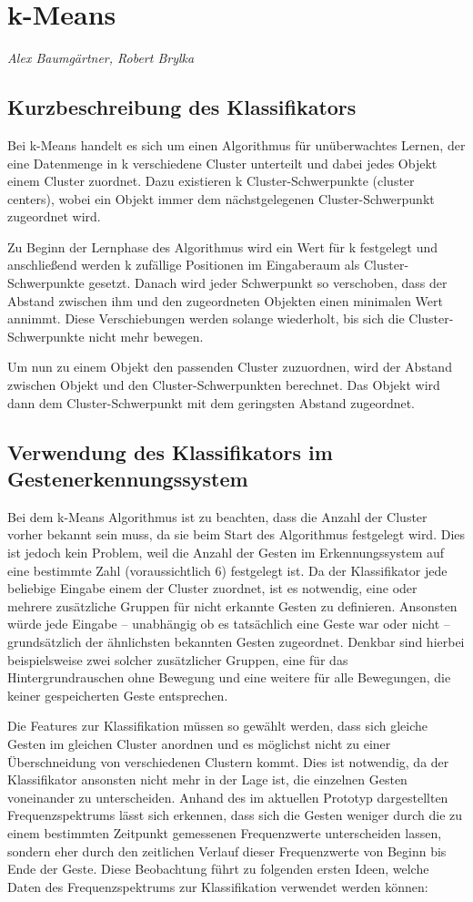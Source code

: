 \section{k-Means}
\textit{Alex Baumgärtner, Robert Brylka}
\subsection{Kurzbeschreibung des Klassifikators}
Bei k-Means handelt es sich um einen Algorithmus für unüberwachtes Lernen, der eine Datenmenge in k verschiedene Cluster unterteilt und dabei jedes Objekt einem Cluster zuordnet. Dazu existieren k Cluster-Schwerpunkte (cluster centers), wobei ein Objekt immer dem nächstgelegenen Cluster-Schwerpunkt zugeordnet wird.

Zu Beginn der Lernphase des Algorithmus wird ein Wert für k festgelegt und anschließend werden k zufällige Positionen im Eingaberaum als Cluster-Schwerpunkte gesetzt. Danach wird jeder Schwerpunkt so verschoben, dass der Abstand zwischen ihm und den zugeordneten Objekten einen minimalen Wert annimmt. Diese Verschiebungen werden solange wiederholt, bis sich die Cluster-Schwerpunkte nicht mehr bewegen.

Um nun zu einem Objekt den passenden Cluster zuzuordnen, wird der Abstand zwischen Objekt und den Cluster-Schwerpunkten berechnet. Das Objekt wird dann dem Cluster-Schwerpunkt mit dem geringsten Abstand zugeordnet.


\subsection{Verwendung des Klassifikators im Gestenerkennungssystem}
Bei dem k-Means Algorithmus ist zu beachten, dass die Anzahl der Cluster vorher bekannt sein muss, da sie beim Start des Algorithmus festgelegt wird. Dies ist jedoch kein Problem, weil die Anzahl der Gesten im Erkennungssystem auf eine bestimmte Zahl (voraussichtlich 6) festgelegt ist. Da der Klassifikator jede beliebige Eingabe einem der Cluster zuordnet, ist es notwendig, eine oder mehrere zusätzliche Gruppen für nicht erkannte Gesten zu definieren. Ansonsten würde jede Eingabe – unabhängig ob es tatsächlich eine Geste war oder nicht – grundsätzlich der ähnlichsten bekannten Gesten zugeordnet. Denkbar sind hierbei beispielsweise zwei solcher zusätzlicher Gruppen, eine für das Hintergrundrauschen ohne Bewegung und eine weitere für alle Bewegungen, die keiner gespeicherten Geste entsprechen.

Die Features zur Klassifikation müssen so gewählt werden, dass sich gleiche Gesten im gleichen Cluster anordnen und es möglichst nicht zu einer Überschneidung von verschiedenen Clustern kommt. Dies ist notwendig, da der Klassifikator ansonsten nicht mehr in der Lage ist, die einzelnen Gesten voneinander zu unterscheiden. Anhand des im aktuellen Prototyp dargestellten Frequenzspektrums lässt sich erkennen, dass sich die Gesten weniger durch die zu einem bestimmten Zeitpunkt gemessenen Frequenzwerte unterscheiden lassen, sondern eher durch den zeitlichen Verlauf dieser Frequenzwerte von Beginn bis Ende der Geste. Diese Beobachtung führt zu folgenden ersten Ideen, welche Daten des Frequenzspektrums zur Klassifikation verwendet werden können:

